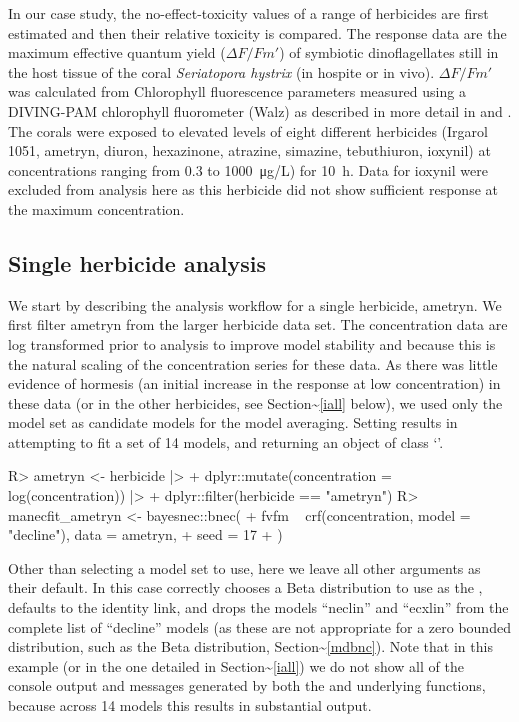 \documentclass[
  shortnames]{jss}
\newcommand{\cls}[1]{`\code{#1}'}
\begin{document}
In our case study, the no-effect-toxicity values of a range of herbicides are first estimated and then their relative toxicity is compared. The response data are the maximum effective quantum yield (\({\Delta F / Fm'}\)) of symbiotic dinoflagellates still in the host tissue of the coral \emph{Seriatopora hystrix} (in hospite or in vivo). \({\Delta F / Fm'}\) was calculated from Chlorophyll fluorescence parameters measured using a DIVING-PAM chlorophyll fluorometer (Walz) as described in more detail in \citet{jones2003meps} and \citet{jones2003effects}. The corals were exposed to elevated levels of eight different herbicides (Irgarol 1051, ametryn, diuron, hexazinone, atrazine, simazine, tebuthiuron, ioxynil) at concentrations ranging from 0.3 to \SI{1000}{\micro\gram/\liter}) for \SI{10}{h}. Data for ioxynil were excluded from analysis here as this herbicide did not show sufficient response at the maximum concentration.

\subsection[Single herbicide]{Single herbicide analysis}\label{isingle}

We start by describing the analysis workflow for a single herbicide, ametryn. We first filter ametryn from the larger herbicide data set. The concentration data are log transformed prior to analysis to improve model stability and because this is the natural scaling of the concentration series for these data. As there was little evidence of hormesis (an initial increase in the response at low concentration) in these data (or in the other herbicides, see Section\textasciitilde{}\ref{iall} below), we used only the  model set as candidate models for the model averaging. Setting  results in  attempting to fit a set of 14 models, and returning an object of class \cls{bayesmancfit}.

\begin{CodeChunk}
\begin{CodeInput}
R> ametryn <- herbicide |>
+   dplyr::mutate(concentration = log(concentration)) |> 
+   dplyr::filter(herbicide == "ametryn")
R> manecfit_ametryn <- bayesnec::bnec(
+   fvfm ~ crf(concentration, model = "decline"), data = ametryn,
+   seed = 17
+ )
\end{CodeInput}
\end{CodeChunk}

Other than selecting a model set to use, here we leave all other  arguments as their default. In this case  correctly chooses a Beta distribution to use as the , defaults to the identity link, and drops the models ``neclin'' and ``ecxlin'' from the complete list of ``decline'' models (as these are not appropriate for a zero bounded distribution, such as the Beta distribution, Section\textasciitilde{}\ref{mdbnc}). Note that in this example (or in the one detailed in Section\textasciitilde{}\ref{iall}) we do not show all of the console output and messages generated by both the  and underlying  functions, because across 14 models this results in substantial output.
\end{document}
